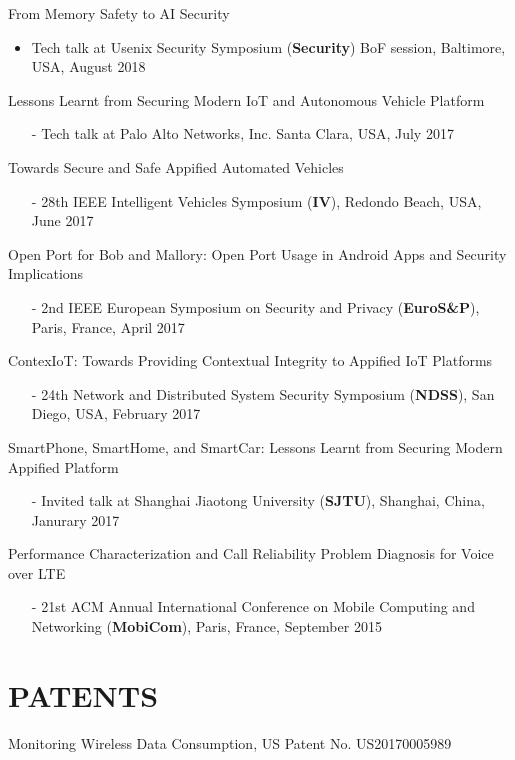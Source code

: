 \documentclass[margin]{res}
\begin{document}
\begin{resume}
From Memory Safety to AI Security
\begin{itemize}
    \item Tech talk at Usenix Security Symposium (\textbf{Security}) BoF session, Baltimore, USA, August 2018 
\end{itemize}

Lessons Learnt from Securing Modern IoT and Autonomous Vehicle Platform
\begin{itemize}
    \item[-] Tech talk at Palo Alto Networks, Inc. Santa Clara, USA, July 2017
\end{itemize}


Towards Secure and Safe Appified Automated Vehicles
\begin{itemize}
    \item[-] 28th IEEE Intelligent Vehicles Symposium (\textbf{IV}), Redondo Beach, USA, June 2017
\end{itemize}

Open Port for Bob and Mallory: Open Port Usage in Android Apps and Security Implications
\begin{itemize}
    \item[-] 2nd IEEE European Symposium on Security and Privacy (\textbf{EuroS\&P}), Paris, France, April 2017
\end{itemize}

ContexIoT: Towards Providing Contextual Integrity to Appified IoT Platforms
\begin{itemize}
    \item[-] 24th Network and Distributed System Security Symposium (\textbf{NDSS}), San Diego, USA, February 2017
\end{itemize}

SmartPhone, SmartHome, and SmartCar: Lessons Learnt from Securing Modern Appified Platform
\begin{itemize}
\item[-] Invited talk at Shanghai Jiaotong University (\textbf{SJTU}), Shanghai, China, Janurary 2017
\end{itemize}

Performance Characterization and Call Reliability Problem Diagnosis for Voice over LTE
\begin{itemize}
\item[-] 21st  ACM Annual International Conference on Mobile Computing and Networking (\textbf{MobiCom}), Paris, France, September 2015
\end{itemize}

\section{PATENTS}
Monitoring Wireless Data Consumption, US Patent No. US20170005989 \href{https://www.google.com/patents/US20170005989}{\color{blue}{[Link]}}


\end{resume}
\end{document}
